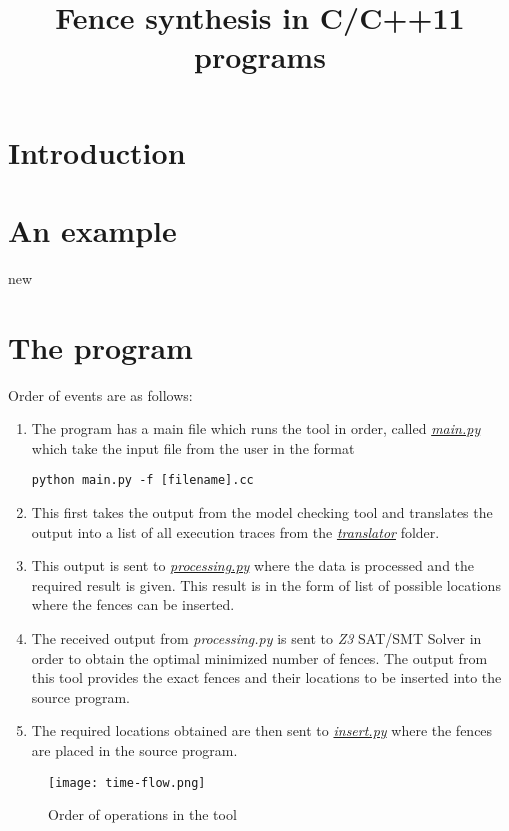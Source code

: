 \documentclass{article}
\date{}
\begin{document}
\title{Fence synthesis in C/C++11 programs}
\maketitle 

\section{Introduction} \label{sec:intro}


\section{An example}
\par
new

\section{The program}
\par
Order of events are as follows:
\begin{enumerate}
    \item The program has a main file which runs the tool in order, called \href{mainpy.tex}{\textit{main.py}} which take the input file from the user in the format \begin{center} \texttt{python main.py -f [filename].cc} \end{center} 
    
    \item This first takes the output from the model checking tool and translates the output into a list of all execution traces from the \href{translator.tex}{\textit{translator}} folder.
    
    \item This output is sent to \href{processing.tex}{\textit{processing.py}} where the data is processed and the required result is given. This result is in the form of list of possible locations where the fences can be inserted.
    
    \item The received output from \textit{processing.py} is sent to \textit{Z3} SAT/SMT Solver in order to obtain the optimal minimized number of fences. The output from this tool provides the exact fences and their locations to be inserted into the source program.
    
    \item The required locations obtained are then sent to \href{insert.tex}{\textit{insert.py}} where the fences are placed in the source program.
    
\end{enumerate}
\begin{figure}
    \centering
    \texttt{[image: time-flow.png]}
    \caption{Order of operations in the tool}
\end{figure}
\end{document}
